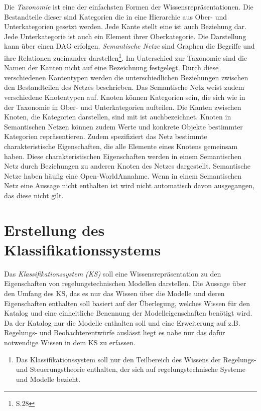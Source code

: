 Die \textit{Taxonomie} ist eine der einfachsten Formen der Wissensrepräsentationen. Die Bestandteile dieser sind Kategorien die in eine Hierarchie aus Ober- und Unterkategorien gesetzt werden. Jede Kante stellt eine \glqq ist auch \grqq Beziehung dar. Jede Unterkategorie ist auch ein Element ihrer Oberkategorie. Die Darstellung kann über einen DAG erfolgen. %
\textit{Semantische Netze} \glqq sind Graphen die Begriffe und ihre Relationen zueinander darstellen\grqq\footnote{\cite{STU09} S.28}. Im Unterschied zur Taxonomie sind die Namen der Kanten nicht auf eine Bezeichnung festgelegt. Durch diese verschiedenen Kantentypen werden die unterschiedlichen Beziehungen zwischen den Bestandteilen des Netzes beschrieben. Das Semantische Netz weist zudem verschiedene Knotentypen auf. Knoten können Kategorien sein, die sich wie in der Taxonomie in Ober- und Unterkategorien aufteilen. Die Kanten zwischen Knoten, die Kategorien darstellen, sind mit \glqq ist auch\grqq bezeichnet. Knoten in Semantischen Netzen können zudem Werte und konkrete Objekte bestimmter Kategorien repräsentieren. Zudem spezifiziert das Netz bestimmte charakteristische Eigenschaften, die alle Elemente eines Knotens gemeinsam haben. Diese charakteristischen Eigenschaften werden in einem Semantischen Netz durch Beziehungen zu anderen Knoten des Netzes dargestellt. Semantische Netze haben häufig eine \glq Open-World\grq  Annahme. Wenn in einem Semantischen Netz eine Aussage nicht enthalten ist wird nicht automatisch davon ausgegangen, das diese nicht gilt.
\section{Erstellung des Klassifikationssystems}
\label{Ch:ErstProz:Sec:KS}
Das \textit{Klassifikationssystem (KS)} soll eine Wissensrepräsentation zu den Eigenschaften von regelungstechnischen Modellen darstellen. Die Aussage über den Umfang des KS, das es nur das Wissen über die Modelle und deren Eigenschaften enthalten soll basiert auf der Überlegung, welches Wissen für den Katalog und eine einheitliche Benennung der Modelleigenschaften benötigt wird. Da der Katalog nur die Modelle enthalten soll und eine Erweiterung auf z.B. Regelungs- und Beobachterentwürfe auslässt liegt es nahe nur das dafür notwendige Wissen in dem KS zu erfassen.
\begin{enumerate}[resume*]
	\item \label{E.KS_Umfang}Das Klassifikationssystem soll nur den Teilbereich des Wissens der Regelungs- und Steuerungstheorie enthalten, der sich auf regelungstechnische Systeme und Modelle bezieht.
\end{enumerate}













